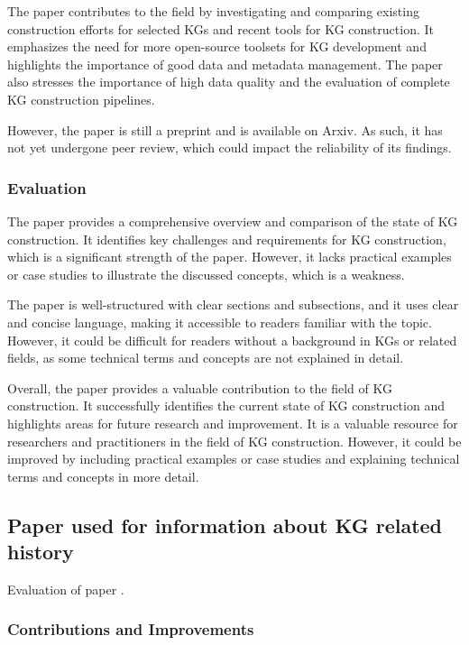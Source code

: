 \documentclass[11pt]{article} %
\begin{document}
The paper contributes to the field by investigating and comparing existing construction efforts for selected KGs and recent tools for KG construction. It emphasizes the need for more open-source toolsets for KG development and highlights the importance of good data and metadata management. The paper also stresses the importance of high data quality and the evaluation of complete KG construction pipelines. 

However, the paper is still a preprint and is available on Arxiv. As such, it has not yet undergone peer review, which could impact the reliability of its findings. 

\subsubsection*{Evaluation}

The paper provides a comprehensive overview and comparison of the state of KG construction. It identifies key challenges and requirements for KG construction, which is a significant strength of the paper. However, it lacks practical examples or case studies to illustrate the discussed concepts, which is a weakness. 

The paper is well-structured with clear sections and subsections, and it uses clear and concise language, making it accessible to readers familiar with the topic. However, it could be difficult for readers without a background in KGs or related fields, as some technical terms and concepts are not explained in detail. 

Overall, the paper provides a valuable contribution to the field of KG construction. It successfully identifies the current state of KG construction and highlights areas for future research and improvement. It is a valuable resource for researchers and practitioners in the field of KG construction. However, it could be improved by including practical examples or case studies and explaining technical terms and concepts in more detail. 


\subsection{Paper used for information about KG related history}
Evaluation of paper .

\subsubsection*{Contributions and Improvements}
\end{document}
